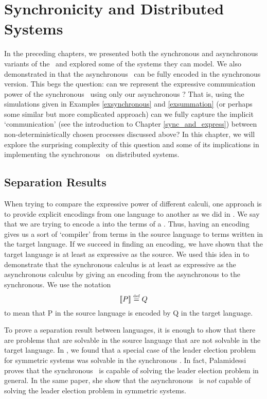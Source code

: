 \chapter{Synchronicity and Distributed Systems}\label{sync_and_dist_sys}
In the preceding chapters, we presented both the synchronous and asynchronous variants of the \picalc\ and explored some of the systems they can model.  
We also demonstrated in  that the asynchronous \picalc\ can be fully encoded in the synchronous version.
This begs the question: can we represent the expressive communication power of the synchronous \picalc\ using only our asynchronous \picalc?  That is, using the simulations given in Examples \ref{exsynchronous} and \ref{exsummation} (or perhaps some similar but more complicated approach) can we fully capture the implicit `communication' (see the introduction to Chapter \ref{sync_and_express}) between non-deterministically chosen processes discussed above?  In this chapter, we will explore the surprising complexity of this question and some of its implications in implementing the synchronous \picalc\ on distributed systems.  



\section{Separation Results}\label{Separation Results}
When trying to compare the expressive power of different calculi, one approach is to provide explicit encodings from one language to another as we did in .
We say that we are trying to encode a  into the terms of a . 
Thus, having an encoding gives us a sort of `compiler' from terms in the source language to terms written in the target language.
If we succeed in finding an encoding, we have shown that the target language is at least as expressive as the source.  
We used this idea in  to demonstrate that the synchronous calculus is at least as expressive as the asynchronous calculus by giving an encoding from the asynchronous to the synchronous.  
We use the notation
\[
	\llbracket{P}\rrbracket \overset{\mbox{\tiny{def}}}{=} Q
\]
to mean that P in the source language is encoded by Q in the target language.

To prove a separation result between languages, it is enough to show that there are problems that are solvable in the source language that are not solvable in the target language.
In , we found that a special case of the leader election problem for symmetric systems was solvable in the synchronous \picalc.
In fact, Palamidessi \cite{palam03} proves that the synchronous \picalc\ is capable of solving the leader election problem in general.
In the same paper, she show that the asynchronous \picalc\ is \emph{not} capable of solving the leader election problem in symmetric systems.
 
